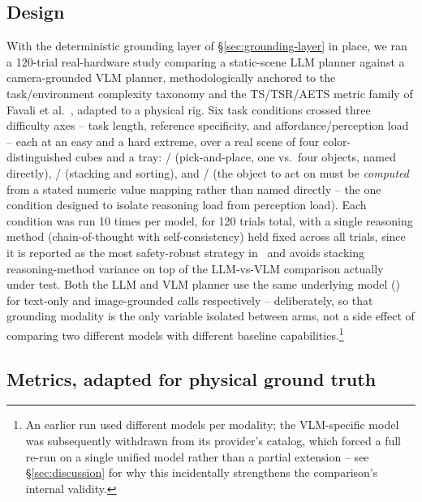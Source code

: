 \subsection{Design}

With the deterministic grounding layer of \S\ref{sec:grounding-layer} in
place, we ran a 120-trial real-hardware study comparing a static-scene LLM
planner against a camera-grounded VLM planner, methodologically anchored
to the task/environment complexity taxonomy and the TS/TSR/AETS metric
family of Favali et al.~\cite{favaliRAS}, adapted to a physical rig. Six
task conditions crossed three difficulty axes -- task length, reference
specificity, and affordance/perception load -- each at an easy and a hard
extreme, over a real scene of four color-distinguished cubes and a tray:
/ (pick-and-place, one vs.\ four objects,
named directly), / (stacking and
sorting), and / (the object to act on
must be \emph{computed} from a stated numeric value mapping rather than
named directly -- the one condition designed to isolate reasoning load
from perception load). Each condition was run 10 times per model, for
120 trials total, with a single reasoning method (chain-of-thought with
self-consistency) held fixed across all trials, since it is reported as
the most safety-robust strategy in~\cite{favaliRAS} and avoids stacking
reasoning-method variance on top of the LLM-vs-VLM comparison actually
under test. Both the LLM and VLM planner use the same underlying model
() for text-only and image-grounded calls respectively --
deliberately, so that grounding modality is the only variable isolated
between arms, not a side effect of comparing two different models with
different baseline capabilities.\footnote{An earlier run used different
models per modality; the VLM-specific model was subsequently withdrawn
from its provider's catalog, which forced a full re-run on a single
unified model rather than a partial extension -- see \S\ref{sec:discussion}
for why this incidentally strengthens the comparison's internal
validity.}

\subsection{Metrics, adapted for physical ground truth}

